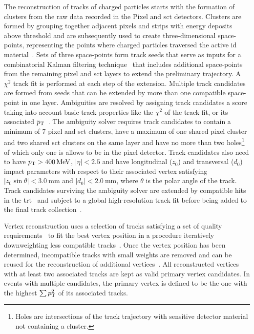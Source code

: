 The reconstruction of tracks of charged particles starts with the formation of clusters from the raw data recorded in the Pixel and \gls{sct} detectors. Clusters are formed by grouping together adjacent pixels and strips with energy deposits above threshold and are subsequently used to create three-dimensional space-points, representing the points where charged particles traversed the active \gls{id} material~\cite{PERF-2015-08}. Sets of three space-points form track seeds that serve as inputs for a combinatorial Kalman filtering technique~\cite{Fruhwirth:178627} that includes additional space-points from the remaining pixel and \gls{sct} layers to extend the preliminary trajectory. A $\chi^2$ track fit is performed at each step of the extension. Multiple track candidates are formed from seeds that can be extended by more than one compatible space-point in one layer. Ambiguities are resolved by assigning track candidates a score taking into account basic track properties like the $\chi^2$ of the track fit, or its associated $p_{\textrm{T}}$~\cite{PERF-2015-08}. The ambiguity solver requires track candidates to contain a minimum of 7 pixel and \gls{sct} clusters, have a maximum of one shared pixel cluster and two shared \gls{sct} clusters on the same layer and have no more than two holes\footnote{Holes are intersections of the track trajectory with sensitive detector material not containing a cluster.} of which only one is allows to be in the pixel detector. Track candidates also need to have $\pt > \SI{400}{\MeV}$, $\vert\eta\vert < 2.5$ and have longitudinal ($z_0$) and transversal ($d_0$) impact parameters with respect to their associated vertex satisfying $\vert z_0 \sin\theta \vert < \SI{3.0}{\milli\meter}$ and $\vert d_0 \vert < \SI{2.0}{\milli\meter}$, where $\theta$ is the polar angle of the track. Track candidates surviving the ambiguity solver are extended by compatible hits in the \gls{trt}~\cite{Cornelissen:1176900} and subject to a global high-resolution track fit before being added to the final track collection~\cite{PERF-2015-08}.

Vertex reconstruction uses a selection of tracks satisfying a set of quality requirements~\cite{ATL-PHYS-PUB-2015-026} to fit the best vertex position in a procedure iteratively downweighting less compatible tracks~\cite{PERF-2015-01}. Once the vertex position has been determined, incompatible tracks with small weights are removed and can be reused for the reconstruction of additional vertices~\cite{PERF-2015-01}. All reconstructed vertices with at least two associated tracks are kept as valid primary vertex candidates. In events with multiple candidates, the primary vertex is defined to be the one with the highest $\sum p_{\textrm{T}}^2$ of its associated tracks.

